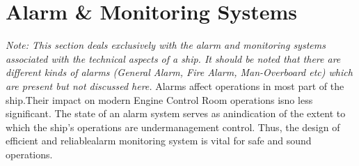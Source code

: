 \documentclass[11pt,a4paper]{article}
\begin{document}
\section{Alarm \& Monitoring Systems}
\textit{Note: This section deals exclusively with the alarm and monitoring systems associated with the technical aspects of a ship. It should be noted that there are different kinds of alarms (General Alarm, Fire Alarm, Man-Overboard etc) which are present but not discussed here.}
Alarms  affect  operations  in  most  part  of  the  ship.Their  impact  on  modern  Engine  Control  Room  operations  isno  less  significant.  The  state  of  an  alarm  system  serves  as  anindication of the extent to which the ship’s operations are undermanagement  control.  Thus,  the  design  of  efficient  and  reliablealarm  monitoring  system  is  vital  for  safe  and  sound  operations.
\end{document}
